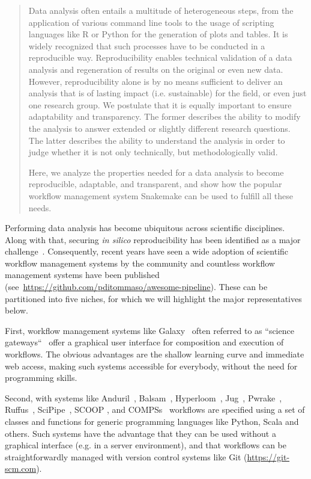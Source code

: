 \documentclass[parskip=half]{scrartcl}
\let\plainurl\url
\renewcommand{\url}[1]{\protect\plainurl{#1}}
\begin{document}
\begin{abstract}
	Data analysis often entails a multitude of heterogeneous steps, from the application of various command line tools to the usage of scripting languages like R or Python for the generation of plots and tables.
	It is widely recognized that such processes have to be conducted in a reproducible way.
	Reproducibility enables technical validation of a data analysis and regeneration of results on the original or even new data.
	However, reproducibility alone is by no means sufficient to deliver an analysis that is of lasting impact (i.e. sustainable) for the field, or even just one research group.
	We postulate that it is equally important to ensure adaptability and transparency.
	The former describes the ability to modify the analysis to answer extended or slightly different research questions.
	The latter describes the ability to understand the analysis in order to judge whether it is not only technically, but methodologically valid.

	Here, we analyze the properties needed for a data analysis to become reproducible, adaptable, and transparent, and show how the popular workflow management system Snakemake can be used to fulfill all these needs.
\end{abstract}

Performing data analysis has become ubiquitous across scientific disciplines.
Along with that, securing \emph{in silico} reproducibility has been identified as a major challenge~\parencite{Mesirov2010,Baker2016,Munaf__2017}.
Consequently, recent years have seen a wide adoption of scientific workflow management systems by the community and countless workflow management systems have been published (see~\url{https://github.com/pditommaso/awesome-pipeline}).
These can be partitioned into five niches, for which we will highlight the major representatives below.

First, workflow management systems like Galaxy~\parencite{Afgan2018} often referred to as ``science gateways``~\parencite{Afgan2011-tv} offer a graphical user interface for composition and execution of workflows.
The obvious advantages are the shallow learning curve and immediate web access, making such systems accessible for everybody, without the need for programming skills.

Second, with systems like Anduril~\parencite{Cervera2019}, Balsam~\parencite{papka2018}, Hyperloom~\parencite{cima2018hyperloom}, Jug~\parencite{Coelho_2017}, Pwrake~\parencite{Tanaka_2010}, Ruffus~\parencite{Goodstadt2010}, SciPipe~\parencite{Lampa2019}, SCOOP \parencite{SCOOP_XSEDE2014}, and COMPSs~\parencite{Lordan_2013} workflows are specified using a set of classes and functions for generic programming languages like Python, Scala and others.
Such systems have the advantage that they can be used without a graphical interface (e.g. in a server environment), and that workflows can be straightforwardly managed with version control systems like Git (\url{https://git-scm.com}).
\end{document}
